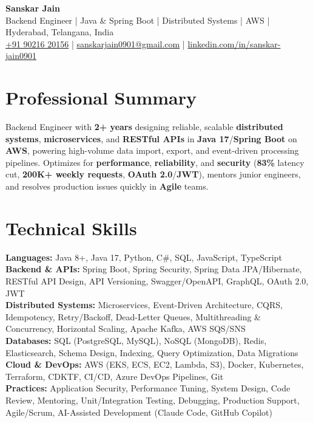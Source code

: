 \documentclass[a4paper,10pt]{article}
\begin{document}
\begin{center}
    {\LARGE \textbf{Sanskar Jain}} \\
    \vspace{2pt}
    Backend Engineer \;|\; Java \& Spring Boot \;|\; Distributed Systems \;|\; AWS \;|\; Hyderabad, Telangana, India \\
    \vspace{2pt}
    \href{tel:+919021620156}{+91 90216 20156} \;|\;
    \href{mailto:sanskarjain0901@gmail.com}{sanskarjain0901@gmail.com} \;|\;
    \href{https://www.linkedin.com/in/sanskar-jain0901/}{linkedin.com/in/sanskar-jain0901}
\end{center}

\section*{Professional Summary}
Backend Engineer with \textbf{2+ years} designing reliable, scalable \textbf{distributed systems}, \textbf{microservices}, and \textbf{RESTful APIs} in \textbf{Java 17}/\textbf{Spring Boot} on \textbf{AWS}, powering high-volume data import, export, and event-driven processing pipelines.
Optimizes for \textbf{performance}, \textbf{reliability}, and \textbf{security} (\textbf{83\%} latency cut, \textbf{200K+ weekly requests}, \textbf{OAuth 2.0}/\textbf{JWT}), mentors junior engineers, and resolves production issues quickly in \textbf{Agile} teams.

\section*{Technical Skills}
\begin{sloppypar}
\noindent
\textbf{Languages:} Java 8+, Java 17, Python, C\#, SQL, JavaScript, TypeScript \\
\textbf{Backend \& APIs:} Spring Boot, Spring Security, Spring Data JPA/Hibernate, RESTful API Design, API Versioning, Swagger/OpenAPI, GraphQL, OAuth 2.0, JWT \\
\textbf{Distributed Systems:} Microservices, Event-Driven Architecture, CQRS, Idempotency, Retry/Backoff, Dead-Letter Queues, Multithreading \& Concurrency, Horizontal Scaling, Apache Kafka, AWS SQS/SNS \\
\textbf{Databases:} SQL (PostgreSQL, MySQL), NoSQL (MongoDB), Redis, Elasticsearch, Schema Design, Indexing, Query Optimization, Data Migrations \\
\textbf{Cloud \& DevOps:} AWS (EKS, ECS, EC2, Lambda, S3), Docker, Kubernetes, Terraform, CDKTF, CI/CD, Azure DevOps Pipelines, Git \\
\textbf{Practices:} Application Security, Performance Tuning, System Design, Code Review, Mentoring, Unit/Integration Testing, Debugging, Production Support, Agile/Scrum, AI-Assisted Development (Claude Code, GitHub Copilot)
\end{sloppypar}
\end{document}
